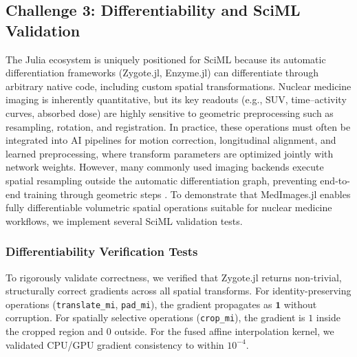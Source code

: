 \documentclass[10pt,letterpaper]{article}
\begin{document}
\subsection*{Challenge 3: Differentiability and SciML Validation}
The Julia ecosystem is uniquely positioned for SciML because its automatic differentiation frameworks (Zygote.jl, Enzyme.jl) can differentiate through arbitrary native code, including custom spatial transformations. Nuclear medicine imaging is inherently quantitative, but its key readouts (e.g., SUV, time–activity curves, absorbed dose) are highly sensitive to geometric preprocessing such as resampling, rotation, and registration. In practice, these operations must often be integrated into AI pipelines for motion correction, longitudinal alignment, and learned preprocessing, where transform parameters are optimized jointly with network weights. However, many commonly used imaging backends execute spatial resampling outside the automatic differentiation graph, preventing end-to-end training through geometric steps \cite{Berman_2024}. To demonstrate that MedImages.jl enables fully differentiable volumetric spatial operations suitable for nuclear medicine workflows, we implement several SciML validation tests.

\subsubsection*{Differentiability Verification Tests}
To rigorously validate correctness, we verified that Zygote.jl returns non-trivial, structurally correct gradients across all spatial transforms. For identity-preserving operations (\texttt{translate\_mi}, \texttt{pad\_mi}), the gradient propagates as $\mathbf{1}$ without corruption. For spatially selective operations (\texttt{crop\_mi}), the gradient is $1$ inside the cropped region and $0$ outside. For the fused affine interpolation kernel, we validated CPU/GPU gradient consistency to within $10^{-4}$.
\end{document}
